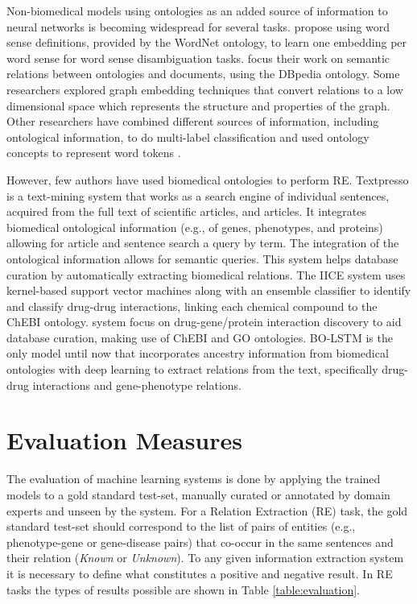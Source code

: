 Non-biomedical models using ontologies as an added source of information to neural networks is becoming widespread for several tasks. \cite{10.1007/978-3-319-50496-4_19} propose using word sense definitions, provided by the WordNet ontology, to learn one embedding per word sense for word sense disambiguation tasks. \cite{10.1007/978-3-319-63579-8_15} focus their work on semantic relations between ontologies and documents, using the DBpedia ontology. Some researchers explored graph embedding techniques \citep{GOYAL201878} that convert relations to a low dimensional space which represents the structure and properties of the graph. Other researchers have combined different sources of information, including ontological information, to do multi-label classification \citep{Kong:2013:MCM:2487575.2487577} and used ontology concepts to represent word tokens \citep{dasigi-etal-2017-ontology}.

However, few authors have used biomedical ontologies to perform RE. Textpresso \citep{10.1371/journal.pbio.0020309} is a text-mining system that works as a search engine of individual sentences, acquired from the full text of scientific articles, and articles. It integrates biomedical ontological information (e.g., of genes, phenotypes, and proteins) allowing for article and sentence search a query by term. The integration of the ontological information allows for semantic queries. This system helps database curation by automatically extracting biomedical relations. The IICE \citep{Lamurias2014IdentifyingIB} system uses kernel-based support vector machines along with an ensemble classifier to identify and classify drug-drug interactions, linking each chemical compound to the ChEBI ontology. \cite{Tripodi2017KnowledgeBaseEnrichedRE} system focus on drug-gene/protein interaction discovery to aid database curation, making use of ChEBI and GO ontologies. BO-LSTM \citep{BOLSTM} is the only model until now that incorporates ancestry information from biomedical ontologies with deep learning to extract relations from the text, specifically drug-drug interactions and gene-phenotype relations. 


\hypertarget{2.4}{\section{Evaluation Measures}}

The evaluation of machine learning systems is done by applying the trained models to a gold standard test-set, manually curated or annotated by domain experts and unseen by the system. For a Relation Extraction (RE) task, the gold standard test-set should correspond to the list of pairs of entities (e.g., phenotype-gene or gene-disease pairs) that co-occur in the same sentences and their relation (\textit{Known} or \textit{Unknown}).
To any given information extraction system it is necessary to define what constitutes a positive and negative result. In RE tasks the types of results possible are shown in Table \ref{table:evaluation}.

